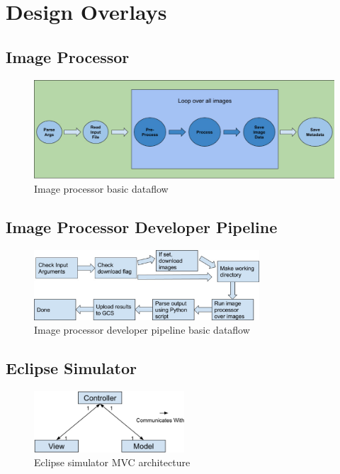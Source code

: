 \documentclass[10pt, onecolumn, draftclsnofoot, letterpaper, compsoc]{IEEEtran}
\begin{document}
\section{Design Overlays}

\subsection{Image Processor}

\begin{figure}[H]
    \centering
    \includegraphics[width=\textwidth]{imgproc.eps}
    \caption{Image processor basic dataflow}
\end{figure}

\subsection{Image Processor Developer Pipeline}

\begin{figure}[H]
    \centering
    \includegraphics[width=0.75\textwidth]{dev.eps}
    \caption{Image processor developer pipeline basic dataflow}
\end{figure}

\subsection{Eclipse Simulator}

\begin{figure}[H]
    \centering
    \includegraphics[width=0.5\textwidth]{jake_fig.eps}
    \caption{Eclipse simulator MVC architecture}
\end{figure}
\end{document}
